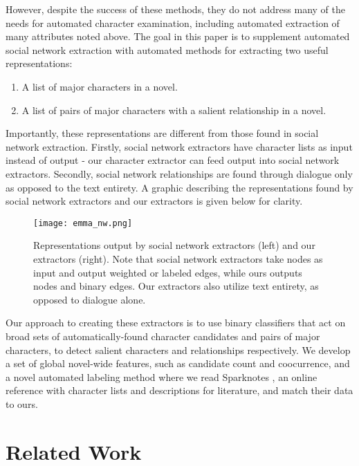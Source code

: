 \documentclass[12pt]{article}
\begin{document}
However, despite the success of these methods, they do not address many of the needs for automated character examination, including automated extraction of many attributes noted above. The goal in this paper is to supplement automated social network extraction with automated methods for extracting two useful representations:  

\begin{enumerate}
    \setlength\itemsep{0em}
    \item A list of major characters in a novel. 
    \item A list of pairs of major characters with a salient relationship in a novel. 
\end{enumerate}

Importantly, these representations are different from those found in social network extraction. Firstly, social network extractors have character lists as input instead of output - our character extractor can feed output into social network extractors. Secondly, social network relationships are found through dialogue only as opposed to the text entirety. A graphic describing the representations found by social network extractors and our extractors is given below for clarity. 

\begin{figure}[H]
    \centering
    \texttt{[image: emma\_nw.png]}
    \caption{Representations output by social network extractors (left) and our extractors (right). Note that social network extractors take nodes as input and output weighted or labeled edges, while ours outputs nodes and binary edges. Our extractors also utilize text entirety, as opposed to dialogue alone.} 
\end{figure}

Our approach to creating these extractors is to use binary classifiers that act on broad sets of automatically-found character candidates and pairs of major characters, to detect salient characters and relationships respectively. We develop a set of global novel-wide features, such as candidate count and coocurrence, and a novel automated labeling method where we read Sparknotes \cite{sparknotes}, an online reference with character lists and descriptions for literature, and match their data to ours. 


\section{Related Work}
\end{document}
